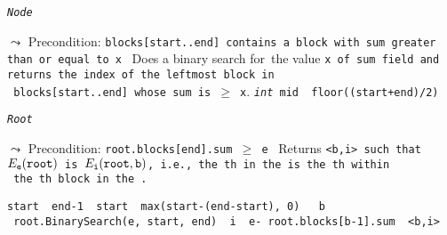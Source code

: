 \begin{algorithm}
\caption{\tt{\sl{Node}}}
\begin{algorithmic}[1]
\setcounter{ALG@line}{25}

\Statex $\leadsto$ \textsf{Precondition: \tt{blocks[start..end]} contains a block with \tt{sum} greater than or equal to \tt{x}}
\Statex \com\ \textmd{Does a binary search for~the value \tt{x} of \tt{sum} field and returns the index of the leftmost block in\\
\com\ \tt{blocks[start..end]} whose \tt{sum} is $\geq$ \tt{x}}.
\State \tt{\sl{int}} \tt{mid \assign\ floor((start+end)/2)}
\State {}
\Else
\State {}
\EndIf
\EndWhile
\State\Return {}

\end{algorithmic}
\end{algorithm}

\begin{algorithm}
\caption{\tt{\sl{Root}}}
\begin{algorithmic}[1]
\setcounter{ALG@line}{36}
\Statex
\Statex $\leadsto$ \textsf{Precondition: \tt{root.blocks[end].sum $\geq$ \tt{e}}}
\Statex \com\ \textmd{Returns \tt{<b,i>} such that $E_{\normalfont{\texttt{e}}}({\normalfont{\texttt{root}}})$ is $E_{\normalfont{\texttt{i}}}({\normalfont{\texttt{root}}},{\normalfont{\texttt{b}}})$, i.e., the th  in the  is the th  within \\
\com\ the th block in the .}

\State \tt{start \assign\ end-1} \label{dsearchStart}
\State \tt{start \assign\ max(start-(end-start), 0)} \label{doubling}
\EndWhile \label{dsearchEnd}
\State \tt{b \assign\ root.BinarySearch(e, start, end)} \label{dsearchBinarySearch}
\State \tt{i \assign\ e- root.blocks[b-1].sum} \label{DSearchComputei}
\State\Return \tt{<b,i>}
\end{algorithmic}
\end{algorithm}


